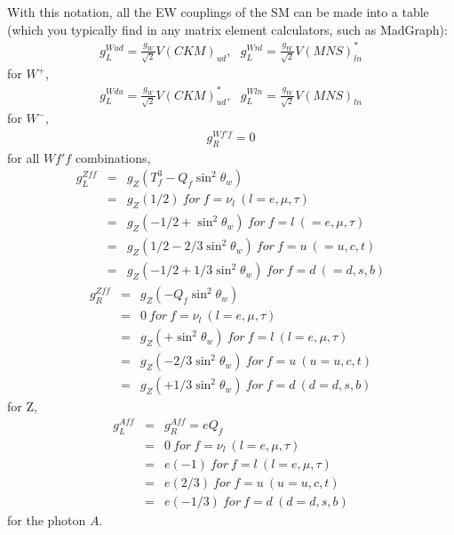 \documentclass[12pt]{article}
\begin{document}
With this notation, all the EW couplings of the SM can be made into
a table (which you typically find in any matrix element calculators,
such as MadGraph):
\begin{eqnarray}
g_L^{Wud} = \frac{g_W}{\sqrt 2} V(CKM)_{ud},~~~
g_L^{Wnl} = \frac{g_W}{\sqrt 2} V(MNS)_{ln}^* \label{eq.18_16a}
\end{eqnarray}
for $W^+$,
\begin{eqnarray}
g_L^{Wdu} = \frac{g_W}{\sqrt 2} V(CKM)_{ud}^*,~~~
g_L^{Wln} = \frac{g_W}{\sqrt 2} V(MNS)_{ln} \label{eq.18_16b}
\end{eqnarray}
for $W^-$,
\begin{eqnarray}
    g_R^{Wf'f} = 0 \label{eq.18_16c}
\end{eqnarray}
for all ${Wf'f}$ combinations,
\begin{eqnarray} \label{eq.18_16d}
g_L^{Zff} &=& g_Z (T^3_f - Q_f \sin^2\theta_w ) \\ 
         &=& g_Z (  1/2            )~  for~ f=\nu_l ~(l=e,\mu,\tau)\nonumber \\
         &=& g_Z ( -1/2 +     \sin^2\theta_w )  ~for ~f=l~ (=e,\mu,\tau)\nonumber \\
         &=& g_Z (  1/2 - 2/3 \sin^2\theta_w )  ~for ~f=u~ (=u,c,t) \nonumber \\
         &=& g_Z ( -1/2 + 1/3 \sin^2\theta_w )  ~for ~f=d~ (=d,s,b) \nonumber
\end{eqnarray}
\begin{eqnarray}\label{eq.18_16e}
    g_R^{Zff} &=& g_Z (      - Q_f \sin^2\theta_w ) \\ 
            &=& 0                  ~     for ~f=\nu_l ~(l=e,\mu,\tau) \nonumber \\
            &=& g_Z (      +     \sin^2\theta_w )~  for ~f=l ~(l=e,\mu,\tau)\nonumber \\
            &=& g_Z (      - 2/3 \sin^2\theta_w ) ~ for ~f=u ~(u=u,c,t)\nonumber \\
            &=& g_Z (      + 1/3 \sin^2\theta_w ) ~ for ~f=d ~(d=d,s,b)\nonumber 
\end{eqnarray}
for Z,
\begin{eqnarray}\label{eq.18_16f}
g_L^{Aff} &=& g_R^{Aff} = e Q_f \\ 
                &=& 0         ~for~ f=\nu_l~ (l=e,\mu,\tau) \nonumber \\
                &=& e ( -1 )  ~for~ f=l ~(l=e,\mu,\tau) \nonumber \\
                &=& e ( 2/3)  ~for~ f=u ~(u=u,c,t) \nonumber \\
                &=& e (-1/3)  ~for~ f=d ~(d=d,s,b)\nonumber 
\end{eqnarray}
for the photon $A$.
\end{document}
